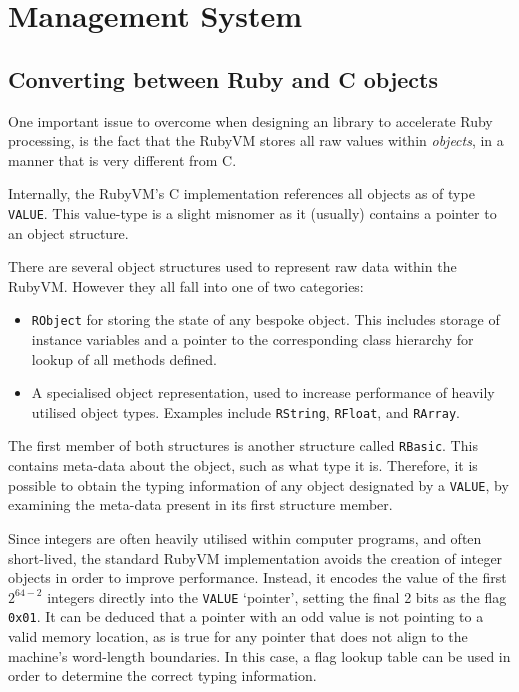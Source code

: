 \section{Management System}

\subsection{Converting between Ruby and C objects}
One important issue to overcome when designing an library to accelerate Ruby processing, is the fact that the RubyVM stores all raw values within \emph{objects}, in a manner that is very different from C.

Internally, the RubyVM's C implementation references all objects as of type \verb|VALUE|. This value-type is a slight misnomer as it (usually) contains a pointer to an object structure.

There are several object structures used to represent raw data within the RubyVM. However they all fall into one of two categories:
\begin{itemize}
     \item \verb|RObject| for storing the state of any bespoke object. This includes storage of instance variables and a pointer to the corresponding class hierarchy for lookup of all methods defined.
     \item A specialised object representation, used to increase performance of heavily utilised object types. Examples include \verb|RString|, \verb|RFloat|, and \verb|RArray|.
\end{itemize}

The first member of both structures is another structure called \verb|RBasic|. This contains meta-data about the object, such as what type it is. Therefore, it is possible to obtain the typing information of any object designated by a \verb|VALUE|, by examining the meta-data present in its first structure member.

Since integers are often heavily utilised within computer programs, and often short-lived, the standard RubyVM implementation avoids the creation of integer objects in order to improve performance.
Instead, it encodes the value of the first $2^{64 - 2}$ integers directly into the \verb|VALUE| `pointer', setting the final 2 bits as the flag \verb|0x01|.
It can be deduced that a pointer with an odd value is not pointing to a valid memory location, as is true for any pointer that does not align to the machine's word-length boundaries. In this case, a flag lookup table can be used in order to determine the correct typing information.

